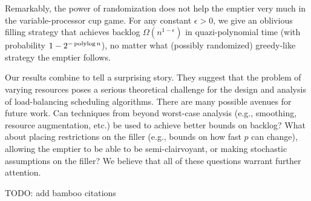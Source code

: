 Remarkably, the power of randomization does not help the emptier very much in the variable-processor cup game. For any constant $\epsilon > 0$, we give an oblivious filling strategy that achieves backlog $\Omega(n^{1 - \epsilon})$ in quazi-polynomial time (with probability $1 - 2^{-\operatorname{\text{polylog}} n}$), no matter what (possibly randomized) greedy-like strategy the emptier follows. 

Our results combine to tell a surprising story. They suggest that the problem of varying resources poses a serious theoretical challenge for the design and analysis of load-balancing scheduling algorithms. There are many possible avenues for future work. Can techniques from beyond worst-case analysis (e.g., smoothing, resource augmentation, etc.) be used to achieve better bounds on backlog? What about placing restrictions on the filler (e.g., bounds on how fast $p$ can change), allowing the emptier to be able to be semi-clairvoyant, or making stochastic assumptions on the filler? We believe that all of these questions warrant further attention.

{\color{blue}
  TODO: add bamboo citations}





